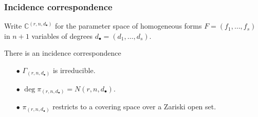 \documentclass{beamer}
\theoremstyle{definition}
\begin{document}
\begin{frame}
\frametitle{Incidence correspondence}
Write $\mathbb{C}^{(r,n,d_\bullet)}$ for the parameter space of homogeneous forms $F = (f_1,\dotsc,f_s)$ in $n+1$ variables of degrees $d_\bullet = (d_1,\dotsc,d_s)$.

There is an incidence correspondence

\vspace{-.3cm}

\begin{center}
\end{center}

\vspace{-.45cm}

\begin{enumerate}
\item[$\bullet$] $\Gamma_{(r,n,d_\bullet)}$ is irreducible.

\item[$\bullet$] $\deg \pi_{(r,n,d_\bullet)} = N(r,n,d_\bullet)$.

\item[$\bullet$] $\pi_{(r,n,d_\bullet)}$ restricts to a covering space over a Zariski open set.
\end{enumerate}
\end{frame}
\end{document}
